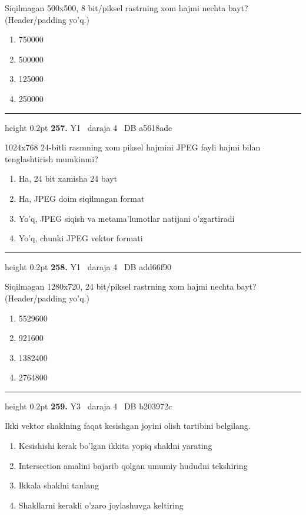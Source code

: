 \documentclass[10pt,a4paper,oneside]{article}
\begin{document}
Siqilmagan 500x500, 8 bit/piksel rastrning xom hajmi nechta bayt? (Header/padding yo'q.)
\begin{enumerate}[label=\Alph*),leftmargin=9mm]
\item 750000
\item 500000
\item 125000
\item 250000
\end{enumerate}
\vspace{2mm}\hrule height 0.2pt \vspace{4mm}
\hypertarget{q257}{\textbf{\color{ink}257.}}  {\color{muted}\scriptsize Y1 \textbullet\ daraja 4 \textbullet\ DB a5618ade}
\par
1024x768 24-bitli rasmning xom piksel hajmini JPEG fayli hajmi bilan tenglashtirish mumkinmi?
\begin{enumerate}[label=\Alph*),leftmargin=9mm]
\item Ha, 24 bit xamisha 24 bayt
\item Ha, JPEG doim siqilmagan format
\item Yo'q, JPEG siqish va metama'lumotlar natijani o'zgartiradi
\item Yo'q, chunki JPEG vektor formati
\end{enumerate}
\vspace{2mm}\hrule height 0.2pt \vspace{4mm}
\hypertarget{q258}{\textbf{\color{ink}258.}}  {\color{muted}\scriptsize Y1 \textbullet\ daraja 4 \textbullet\ DB add66f90}
\par
Siqilmagan 1280x720, 24 bit/piksel rastrning xom hajmi nechta bayt? (Header/padding yo'q.)
\begin{enumerate}[label=\Alph*),leftmargin=9mm]
\item 5529600
\item 921600
\item 1382400
\item 2764800
\end{enumerate}
\vspace{2mm}\hrule height 0.2pt \vspace{4mm}
\hypertarget{q259}{\textbf{\color{ink}259.}}  {\color{muted}\scriptsize Y3 \textbullet\ daraja 4 \textbullet\ DB b203972c}
\par
Ikki vektor shaklning faqat kesishgan joyini olish tartibini belgilang.
\begin{enumerate}[label=\Alph*),leftmargin=9mm]
\item Kesishishi kerak bo'lgan ikkita yopiq shaklni yarating
\item Intersection amalini bajarib qolgan umumiy hududni tekshiring
\item Ikkala shaklni tanlang
\item Shakllarni kerakli o'zaro joylashuvga keltiring
\end{enumerate}
\end{document}
